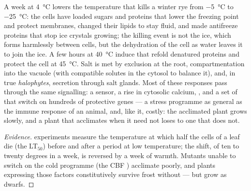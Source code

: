 \begin{proposition}\label{prop:b2:plant-plasticity:stress}
A week at \qty{4}{\celsius} lowers the temperature that kills a
winter rye from \qty{-5}{\celsius} to \qty{-25}{\celsius}: the
cells have loaded sugars and proteins that lower the freezing point
and protect membranes, changed their lipids to stay fluid, and made
antifreeze proteins that stop ice crystals growing; the killing
event is not the ice, which forms harmlessly between cells, but the
dehydration of the cell as water leaves it to join the ice. A few
hours at \qty{40}{\celsius} induce \emph{} that
refold denatured proteins and protect the cell at
\qty{45}{\celsius}. Salt is met by exclusion at the root,
compartmentation into the vacuole (with compatible solutes in the
cytosol to balance it), and, in true \emph{halophytes}, secretion
through salt glands. Most of these responses pass through the same
signalling: a sensor, a rise in cytosolic calcium, ,
and a set of  that switch on hundreds of
protective genes --- a stress programme as general as the immune
response of an animal, and, like it, costly: the acclimated plant
grows slowly, and a plant that acclimates when it need not loses to
one that does not.
\end{proposition}
\begin{proof}[Evidence]
 experiments measure the temperature at which half
the cells of a leaf die (the LT$_{50}$) before and after a period at
low temperature; the shift, of ten to twenty degrees in a week, is
reversed by a week of warmth. Mutants unable to switch on the cold
programme (the CBF ) acclimate poorly, and
plants expressing those factors constitutively survive frost
without  --- but grow as dwarfs.
\end{proof}

